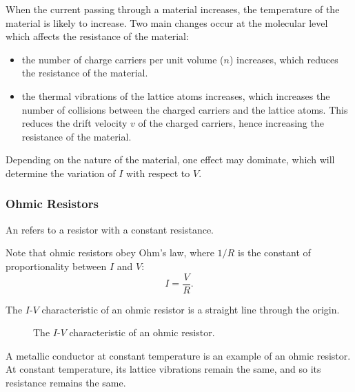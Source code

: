 When the current passing through a material increases, the temperature of the material is likely to increase. Two main changes occur at the molecular level which affects the resistance of the material:
\begin{itemize}
    \item the number of charge carriers per unit volume ($n$) increases, which reduces the resistance of the material.
    \item the thermal vibrations of the lattice atoms increases, which increases the number of collisions between the charged carriers and the lattice atoms. This reduces the drift velocity $v$ of the charged carriers, hence increasing the resistance of the material.
\end{itemize}

Depending on the nature of the material, one effect may dominate, which will determine the variation of $I$ with respect to $V$.

\subsubsection{Ohmic Resistors}

An  refers to a resistor with a constant resistance.

Note that ohmic resistors obey Ohm's law, where $1/R$ is the constant of proportionality between $I$ and $V$: \[I = \frac{V}{R}.\]

The $I$-$V$ characteristic of an ohmic resistor is a straight line through the origin.

\begin{figure}[H]
    \centering
    \caption{The $I$-$V$ characteristic of an ohmic resistor.}
\end{figure}

A metallic conductor at constant temperature is an example of an ohmic resistor. At constant temperature, its lattice vibrations remain the same, and so its resistance remains the same.

